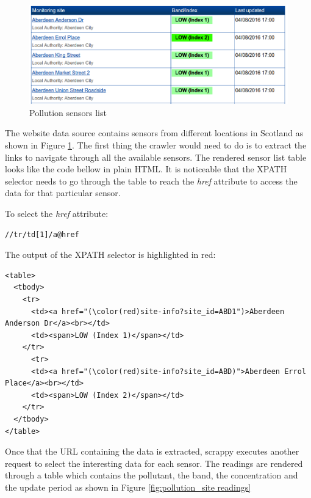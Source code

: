 \begin{figure}[H]
\begin{adjustbox}{width=.5\textwidth,center=\textwidth}
  \centering
  \includegraphics[scale=1]{images/monitoring_summary.png}
\end{adjustbox}
  \caption[Pollution sensors list]{Pollution sensors list \footnotemark}
  \label{fig:pollution_sensors_list}
\end{figure}

The website data source contains sensors from different locations in Scotland as shown in Figure \ref{fig:pollution_sensors_list}. The first thing the crawler would need to do is to extract the links to navigate through all the available sensors. The rendered sensor list table looks like the code bellow in plain HTML. It is noticeable that the XPATH selector needs to go through the table to reach the \textit{href} attribute to access the data for that particular sensor.

To select the \textit{href} attribute: \bigskip

{\centering
\begin{BVerbatim}
//tr/td[1]/a@href
\end{BVerbatim}
\par
}\bigskip

The output of the XPATH selector is highlighted in red: 

\begin{Verbatim}[fontsize=\small,commandchars=\\\(\)]
<table>
  <tbody>
    <tr>
      <td><a href="(\color(red)site-info?site_id=ABD1")>Aberdeen Anderson Dr</a><br></td>
      <td><span>LOW (Index 1)</span></td>
    </tr>
      <tr>
      <td><a href="(\color(red)site-info?site_id=ABD)">Aberdeen Errol Place</a><br></td>
      <td><span>LOW (Index 2)</span></td>
    </tr>
  </tbody>
</table>
\end{Verbatim}

Once that the URL containing the data is extracted, scrappy executes another request to select the interesting data for each sensor. The readings are rendered through a table which contains the pollutant, the band, the concentration and the update period as shown in Figure \ref{fig:pollution_site readings}

